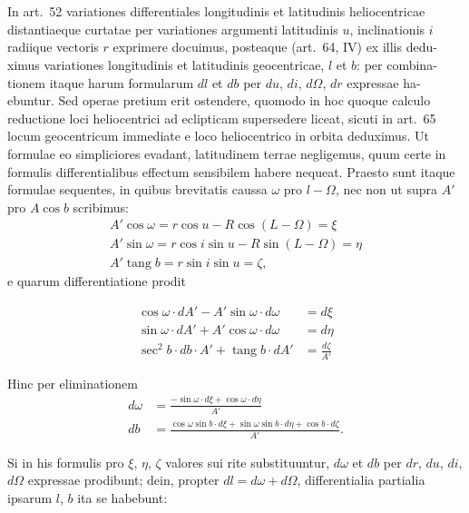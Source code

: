 \documentclass[12pt,a4paper]{article}
\newcommand{\tang}{\mathop{\mathrm{tang}}\nolimits}
\begin{document}
\section{}
In art.~52 variationes differentiales longitudinis et latitudinis heliocentricae
distantiaeque curtatae per variationes argumenti latitudinis $u$, inclinationis $i$
radiique vectoris $r$ exprimere docuimus, posteaque (art.~64, IV) ex illis dedu-
ximus variationes longitudinis et latitudinis geocentricae, $l$ et $b$: per combina-
tionem itaque harum formularum $dl$ et $db$ per $du$, $di$, $d\Omega$, $dr$ expressae ha-ebuntur. Sed operae pretium erit ostendere, quomodo in hoc quoque calculo
reductione loci heliocentrici ad eclipticam supersedere liceat, sicuti in art.~65
locum geocentricum immediate e loco heliocentrico in orbita deduximus. Ut
formulae eo simpliciores evadant, latitudinem terrae negligemus, quum certe
in formulis differentialibus effectum sensibilem habere nequeat. Praesto sunt
itaque formulae sequentes, in quibus brevitatis caussa $\omega$ pro $l - \Omega$, nec non ut
supra $A'$ pro $A\cos b$ scribimus:
\begin{gather*}
A'\cos\omega = r\cos u - R\cos(L - \Omega) = \xi \\
A'\sin\omega = r\cos i\sin u - R\sin(L - \Omega) = \eta \\
A'\tang b = r\sin i\sin u = \zeta,
\end{gather*}
e quarum differentiatione prodit

\begin{align*}
\cos\omega \cdot dA' - A'\sin\omega \cdot d\omega &= d\xi \\
\sin\omega \cdot dA' + A'\cos\omega \cdot d\omega &= d\eta \\
\sec^2 b \cdot db \cdot A' + \tang b \cdot dA' &= \frac{d\zeta}{A'}
\end{align*}

Hinc per eliminationem
\begin{align*}
d\omega &= \frac{-\sin\omega \cdot d\xi + \cos\omega \cdot d\eta}{A'} \\
db &= \frac{\cos\omega\sin b \cdot d\xi + \sin\omega\sin b \cdot d\eta + \cos b \cdot d\zeta}{A'}.
\end{align*}

Si in his formulis pro $\xi$, $\eta$, $\zeta$ valores sui rite substituuntur, $d\omega$ et $db$ per
$dr$, $du$, $di$, $d\Omega$ expressae prodibunt; dein, propter $dl = d\omega + d\Omega$, differentialia
partialia ipsarum $l$, $b$ ita se habebunt:
\end{document}
